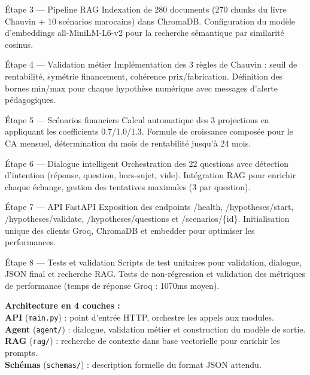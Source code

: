 \documentclass[12pt, a4paper]{report}
\begin{document}
\begin{stepbox}{Étape 3 — Pipeline RAG}
Indexation de 280 documents (270 chunks du livre Chauvin + 10 scénarios marocains) dans ChromaDB. Configuration du modèle d'embeddings all-MiniLM-L6-v2 pour la recherche sémantique par similarité cosinus.
\end{stepbox}

\begin{stepbox}{Étape 4 — Validation métier}
Implémentation des 3 règles de Chauvin : seuil de rentabilité, symétrie financement, cohérence prix/fabrication. Définition des bornes min/max pour chaque hypothèse numérique avec messages d'alerte pédagogiques.
\end{stepbox}

\begin{stepbox}{Étape 5 — Scénarios financiers}
Calcul automatique des 3 projections en appliquant les coefficients 0.7/1.0/1.3. Formule de croissance composée pour le CA mensuel, détermination du mois de rentabilité jusqu'à 24 mois.
\end{stepbox}

\begin{stepbox}{Étape 6 — Dialogue intelligent}
Orchestration des 22 questions avec détection d'intention (réponse, question, hors-sujet, vide). Intégration RAG pour enrichir chaque échange, gestion des tentatives maximales (3 par question).
\end{stepbox}

\begin{stepbox}{Étape 7 — API FastAPI}
Exposition des endpoints /health, /hypotheses/start, /hypotheses/validate, /hypotheses/questions et /scenarios/\{id\}. Initialisation unique des clients Groq, ChromaDB et embedder pour optimiser les performances.
\end{stepbox}

\begin{stepbox}{Étape 8 — Tests et validation}
Scripts de test unitaires pour validation, dialogue, JSON final et recherche RAG. Tests de non-régression et validation des métriques de performance (temps de réponse Groq : 1070ms moyen).
\end{stepbox}

\vspace{12pt}
\begin{resultbox}
\textbf{\color{darkgreen} Architecture en 4 couches :}\\
\textbf{API} (\texttt{main.py}) : point d'entrée HTTP, orchestre les appels aux modules.\\
\textbf{Agent} (\texttt{agent/}) : dialogue, validation métier et construction du modèle de sortie.\\
\textbf{RAG} (\texttt{rag/}) : recherche de contexte dans base vectorielle pour enrichir les prompts.\\
\textbf{Schémas} (\texttt{schemas/}) : description formelle du format JSON attendu.
\end{resultbox}
\end{document}
